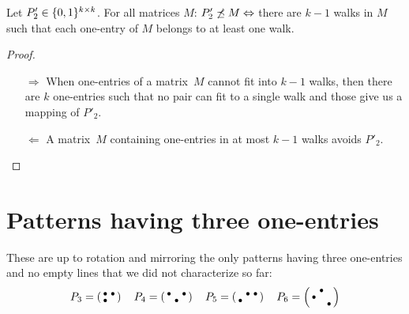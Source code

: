 \begin{prop}
\label{prop:walking}
Let $P'_2\in\{0,1\}^{k\times k}$. For all matrices $M$: $P'_2\not\preceq M\Leftrightarrow$ there are $k-1$ walks in $M$ such that each one-entry of $M$ belongs to at least one walk.
\end{prop}
\begin{proof}
\begin{itemize}
	\item[$\Rightarrow$] When one-entries of a matrix~$M$ cannot fit into $k-1$ walks, then there are $k$ one-entries such that no pair can fit to a single walk and those give us a mapping of $P'_2$.
	\item[$\Leftarrow$] A matrix~$M$ containing one-entries in at most $k-1$ walks avoids $P'_2$. \qedhere
\end{itemize}
\end{proof}

\section{Patterns having three one-entries}
\label{sec:3ones}
These are up to rotation and mirroring the only patterns having three one-entries and no empty lines that we did not characterize so far:
$$P_3=\smm{\bullet&\bullet\\\bullet& }\ \ 
\ P_4=\smm{\bullet& &\bullet\\ &\bullet& }\ \ 
\ P_5=\smm{ &\bullet&\bullet\\\bullet& & }\ \ 
\ P_6=\smm{ &\bullet& \\\bullet& & \\ & &\bullet}$$

